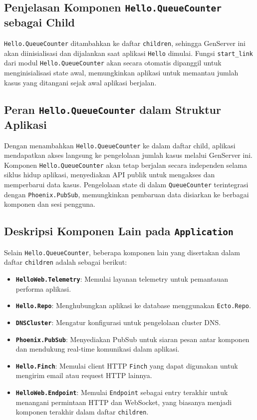 \subsection{Penjelasan Komponen \texttt{Hello.QueueCounter} sebagai Child}
\texttt{Hello.QueueCounter} ditambahkan ke daftar \texttt{children}, sehingga GenServer ini akan diinisialisasi dan dijalankan saat aplikasi \texttt{Hello} dimulai. Fungsi \texttt{start\_link} dari modul \texttt{Hello.QueueCounter} akan secara otomatis dipanggil untuk menginisialisasi state awal, memungkinkan aplikasi untuk memantau jumlah kasus yang ditangani sejak awal aplikasi berjalan.

\subsection{Peran \texttt{Hello.QueueCounter} dalam Struktur Aplikasi}
Dengan menambahkan \texttt{Hello.QueueCounter} ke dalam daftar child, aplikasi mendapatkan akses langsung ke pengelolaan jumlah kasus melalui GenServer ini. Komponen \texttt{Hello.QueueCounter} akan tetap berjalan secara independen selama siklus hidup aplikasi, menyediakan API publik untuk mengakses dan memperbarui data kasus. Pengelolaan state di dalam \texttt{QueueCounter} terintegrasi dengan \texttt{Phoenix.PubSub}, memungkinkan pembaruan data disiarkan ke berbagai komponen dan sesi pengguna.

\subsection{Deskripsi Komponen Lain pada \texttt{Application}}
Selain \texttt{Hello.QueueCounter}, beberapa komponen lain yang disertakan dalam daftar \texttt{children} adalah sebagai berikut:

\begin{itemize}
	\item \textbf{\texttt{HelloWeb.Telemetry}}: Memulai layanan telemetry untuk pemantauan performa aplikasi.
	\item \textbf{\texttt{Hello.Repo}}: Menghubungkan aplikasi ke database menggunakan \texttt{Ecto.Repo}.
	\item \textbf{\texttt{DNSCluster}}: Mengatur konfigurasi untuk pengelolaan cluster DNS.
	\item \textbf{\texttt{Phoenix.PubSub}}: Menyediakan PubSub untuk siaran pesan antar komponen dan mendukung real-time komunikasi dalam aplikasi.
	\item \textbf{\texttt{Hello.Finch}}: Memulai client HTTP \texttt{Finch} yang dapat digunakan untuk mengirim email atau request HTTP lainnya.
	\item \textbf{\texttt{HelloWeb.Endpoint}}: Memulai \texttt{Endpoint} sebagai entry terakhir untuk menangani permintaan HTTP dan WebSocket, yang biasanya menjadi komponen terakhir dalam daftar \texttt{children}.
\end{itemize}

